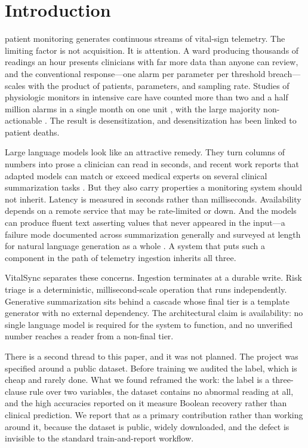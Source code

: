 \documentclass[lettersize,journal]{IEEEtran}
\begin{document}
\section{Introduction}

 patient monitoring generates continuous streams of
vital-sign telemetry. The limiting factor is not acquisition. It is attention. A
ward producing thousands of readings an hour presents clinicians with far more
data than anyone can review, and the conventional response---one alarm per
parameter per threshold breach---scales with the product of patients,
parameters, and sampling rate. Studies of physiologic monitors in intensive care
have counted more than two and a half million alarms in a single month on one
unit \cite{drew2014}, with the large majority non-actionable
\cite{sendelbach2013}. The result is desensitization, and desensitization has
been linked to patient deaths.

Large language models look like an attractive remedy. They turn columns of
numbers into prose a clinician can read in seconds, and recent work reports that
adapted models can match or exceed medical experts on several clinical
summarization tasks \cite{vanveen2024}. But they also carry properties a
monitoring system should not inherit. Latency is measured in seconds rather than
milliseconds. Availability depends on a remote service that may be rate-limited
or down. And the models can produce fluent text asserting values that never
appeared in the input---a failure mode documented across summarization
generally \cite{huang2025} and surveyed at length for natural
language generation as a whole \cite{ji2023}. A system that puts such a
component in the path of telemetry ingestion inherits all three.

VitalSync separates these concerns. Ingestion terminates at a durable write.
Risk triage is a deterministic, millisecond-scale operation that runs
independently. Generative summarization sits behind a cascade whose final tier
is a template generator with no external dependency. The architectural claim is
availability: no single language model is required for the system to function,
and no unverified number reaches a reader from a non-final tier.

There is a second thread to this paper, and it was not planned. The project was
specified around a public dataset. Before training we audited the label, which
is cheap and rarely done. What we found reframed the work: the label is a
three-clause rule over two variables, the dataset contains no abnormal reading
at all, and the high accuracies reported on it measure Boolean recovery rather
than clinical prediction. We report that as a primary contribution rather than
working around it, because the dataset is public, widely downloaded, and the
defect is invisible to the standard train-and-report workflow.
\end{document}
